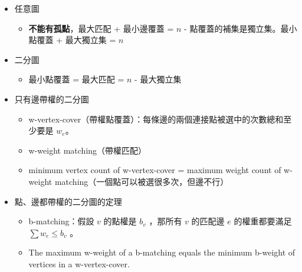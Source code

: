 \begin{itemize}
    \item 任意圖
        \begin{itemize}
            \item \textbf{不能有孤點}，最大匹配 + 最小邊覆蓋 = $n$
            - 點覆蓋的補集是獨立集。最小點覆蓋 + 最大獨立集 = $n$
        \end{itemize}
    \item 二分圖
        \begin{itemize}
            \item 最小點覆蓋 = 最大匹配 = $n$ - 最大獨立集
        \end{itemize}
    \item 只有邊帶權的二分圖
        \begin{itemize}
            \item w-vertex-cover（帶權點覆蓋）：每條邊的兩個連接點被選中的次數總和至少要是 $w_e$。
            \item w-weight matching（帶權匹配） 
            \item minimum vertex count of w-vertex-cover = maximum weight count of w-weight matching（一個點可以被選很多次，但邊不行）
        \end{itemize}
    \item 點、邊都帶權的二分圖的定理
        \begin{itemize}
            \item b-matching：假設 $v$ 的點權是 $b_v$ ，那所有 $v$ 的匹配邊 $e$ 的權重都要滿足 $\sum{w_e}\leq b_v$ 。
            \item The maximum w-weight of a b-matching equals the minimum b-weight of vertices in a w-vertex-cover.
        \end{itemize}
\end{itemize}

